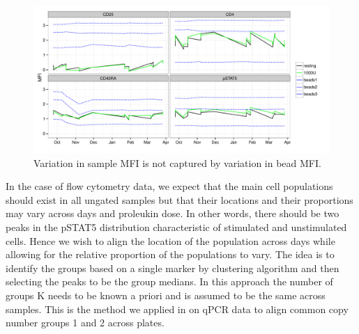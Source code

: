 \begin{figure}[h]
    \centering
    \includegraphics[scale=.5]{IL2/figures/beads.pdf}
    {Variation in sample MFI is not captured by variation in bead MFI.}
    { }
\end{figure}



In the case of flow cytometry data, we expect that the main cell populations should exist in all ungated samples but that their locations and their
proportions may vary across days and proleukin dose.
In other words, there should be two peaks in the pSTAT5 distribution characteristic of stimulated and unstimulated cells.
Hence we wish to align the location of the population across days while allowing for the relative proportion of the populations to vary.  
The idea is to identify the groups based on a single marker by clustering algorithm and then selecting the peaks to be the group medians.
In this approach the number of groups K needs to be known a priori and is assumed to be the same across samples.
This is the method we applied in  on qPCR data to align common copy number groups 1 and 2 across plates.

